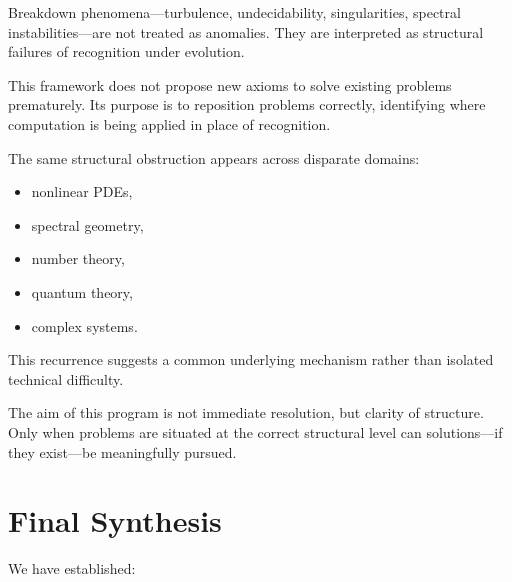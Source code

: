 \documentclass[12pt, oneside]{article}
\begin{document}
Breakdown phenomena—turbulence, undecidability, singularities, spectral instabilities—are not treated as anomalies. They are interpreted as structural failures of recognition under evolution.

This framework does not propose new axioms to solve existing problems prematurely. Its purpose is to reposition problems correctly, identifying where computation is being applied in place of recognition.

The same structural obstruction appears across disparate domains:
\begin{itemize}
    \item nonlinear PDEs,
    \item spectral geometry,
    \item number theory,
    \item quantum theory,
    \item complex systems.
\end{itemize}

This recurrence suggests a common underlying mechanism rather than isolated technical difficulty.

The aim of this program is not immediate resolution, but clarity of structure. Only when problems are situated at the correct structural level can solutions—if they exist—be meaningfully pursued.

\section{Final Synthesis}

We have established:
\end{document}

